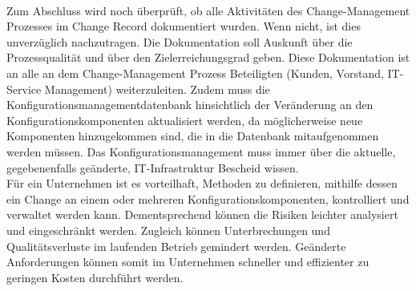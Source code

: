 \\
Zum Abschluss wird noch überprüft, ob alle Aktivitäten des Change-Management Prozesses im Change Record dokumentiert wurden. Wenn nicht, ist dies unverzüglich nachzutragen. Die Dokumentation soll Auskunft über die Prozessqualität und über den Zielerreichungsgrad geben. Diese Dokumentation ist an alle an dem Change-Management Prozess Beteiligten (Kunden, Vorstand, IT-Service Management) weiterzuleiten. Zudem muss die Konfigurationsmanagementdatenbank hinsichtlich der Veränderung an den Konfigurationskomponenten aktualisiert werden, da möglicherweise neue Komponenten hinzugekommen sind, die in die Datenbank mitaufgenommen werden müssen. Das Konfigurationsmanagement muss immer über die aktuelle, gegebenenfalls geänderte, IT-Infrastruktur Bescheid wissen.
\\
Für ein Unternehmen ist es vorteilhaft, Methoden zu definieren, mithilfe dessen ein Change an einem oder mehreren Konfigurationskomponenten, kontrolliert und verwaltet werden kann. Dementsprechend können die Risiken leichter analysiert und eingeschränkt werden. Zugleich können Unterbrechungen und Qualitätsverluste im laufenden Betrieb gemindert werden. Geänderte Anforderungen können somit im Unternehmen schneller und effizienter zu geringen Kosten durchführt werden. 